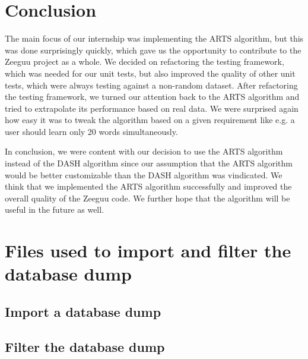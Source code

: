 \documentclass{article}
\begin{document}
\section{Conclusion}
The main focus of our internship was implementing the ARTS algorithm, but this was done surprisingly quickly, which gave us the opportunity to contribute to the Zeeguu project as a whole. We decided on refactoring the testing framework, which was needed for our unit tests, but also improved the quality of other unit tests, which were always testing against a non-random dataset. After refactoring the testing framework, we turned our attention back to the ARTS algorithm and tried to extrapolate its performance based on real data. We were surprised again how easy it was to tweak the algorithm based on a given requirement like e.g. a user should learn only 20 words simultaneously. 

In conclusion, we were content with our decision to use the ARTS algorithm instead of the DASH algorithm since our assumption that the ARTS algorithm would be better customizable than the DASH algorithm was vindicated. We think that we implemented the ARTS algorithm successfully and improved the overall quality of the Zeeguu code. We further hope that the algorithm will be useful in the future as well. 

\nocite{khajah2014maximizing}




\pagebreak
\appendix
\section{Files used to import and filter the database dump}
\subsection{Import a database dump}

\subsection{Filter the database dump}

\end{document}
